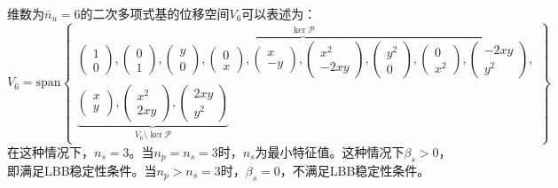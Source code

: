 维数为$\bar{n}_u=6$的二次多项式基的位移空间$V_6$可以表述为：
\begin{equation}\label{ch_3:eq:base2}
    V_6 = \mathrm{span}
    \begin{Bmatrix}
        \overbrace{
        \begin{pmatrix} 1 \\ 0 \end{pmatrix},
        \begin{pmatrix} 0 \\ 1 \end{pmatrix},
        \begin{pmatrix} y \\ 0 \end{pmatrix},
        \begin{pmatrix} 0 \\ x \end{pmatrix},
        \begin{pmatrix} x \\ -y \end{pmatrix},
        \begin{pmatrix} x^2 \\ -2xy \end{pmatrix},
        \begin{pmatrix} y^2 \\ 0 \end{pmatrix},
        \begin{pmatrix} 0 \\ x^2 \end{pmatrix},
        \begin{pmatrix} -2xy \\ y^2 \end{pmatrix}
        }^{\ker \mathcal P}, \\
        \underbrace{
        \begin{pmatrix} x \\ y \end{pmatrix},
        \begin{pmatrix} x^2 \\ 2xy \end{pmatrix},
        \begin{pmatrix} 2xy \\ y^2 \end{pmatrix}
        }_{V_6\setminus \ker \mathcal P}
    \end{Bmatrix}
\end{equation}
在这种情况下，$n_s=3$。当$n_p=n_s=3$时，$n_s$为最小特征值。这种情况下$\beta_s>0$，即满足LBB稳定性条件。当$n_p>n_s=3$时，$\beta_s=0$，不满足LBB稳定性条件。

